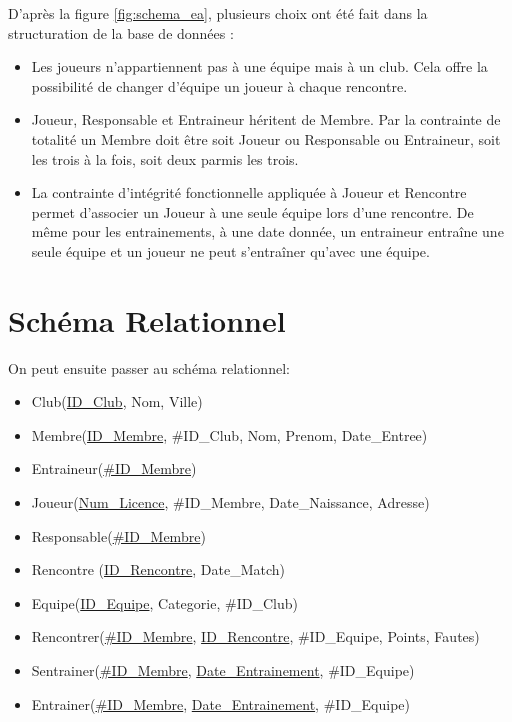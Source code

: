 \documentclass[a4paper»,8pt,french,fleqn]{report}
\begin{document}
D'après la figure \ref{fig:schema_ea}, plusieurs choix ont été fait dans la structuration de la base de données : \\

\begin{itemize}

\item Les joueurs n'appartiennent pas à une équipe mais à un club. Cela offre la possibilité de changer d'équipe un joueur à chaque rencontre. \\

\item Joueur, Responsable et Entraineur héritent de Membre. Par la contrainte de totalité un Membre doit être soit Joueur ou Responsable ou Entraineur, soit les trois à la fois, soit deux parmis les trois. \\

\item La contrainte d'intégrité fonctionnelle appliquée à Joueur et Rencontre permet d'associer un Joueur à une seule équipe lors d'une rencontre. De même pour les entrainements, à une date donnée, un entraineur entraîne une seule équipe et un joueur ne peut s'entraîner qu'avec une équipe.

\end{itemize}

\section{Schéma Relationnel}

On peut ensuite passer au schéma relationnel: \\

\begin{itemize}

\item Club(\underline{ID\_Club}, Nom, Ville)  
\item Membre(\underline{ID\_Membre}, \#ID\_Club, Nom, Prenom, Date\_Entree) 
\item Entraineur(\underline{\#ID\_Membre}) 
\item Joueur(\underline{Num\_Licence}, \#ID\_Membre, Date\_Naissance, Adresse) 
\item Responsable(\underline{\#ID\_Membre}) 
\item Rencontre (\underline{ID\_Rencontre}, Date\_Match) 
\item Equipe(\underline{ID\_Equipe}, Categorie, \#ID\_Club) 
\item Rencontrer(\underline{\#ID\_Membre}, \underline{ID\_Rencontre}, \#ID\_Equipe, Points, Fautes) 
\item Sentrainer(\underline{\#ID\_Membre}, \underline{Date\_Entrainement}, \#ID\_Equipe) 
\item Entrainer(\underline{\#ID\_Membre}, \underline{Date\_Entrainement}, \#ID\_Equipe) \\

\end{itemize}
\end{document}
